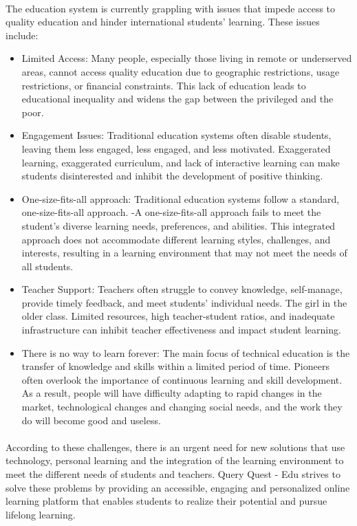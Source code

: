 \paragraph{} The education system is currently grappling with issues that impede access to quality education and hinder international students' learning. These issues include:
\begin{itemize}
\item Limited Access: Many people, especially those living in remote or underserved areas, cannot access quality education due to geographic restrictions, usage restrictions, or financial constraints. This lack of education leads to educational inequality and widens the gap between the privileged and the poor.

\item Engagement Issues: Traditional education systems often disable students, leaving them less engaged, less engaged, and less motivated. Exaggerated learning, exaggerated curriculum, and lack of interactive learning can make students disinterested and inhibit the development of positive thinking.

\item One-size-fits-all approach: Traditional education systems follow a standard, one-size-fits-all approach. -A one-size-fits-all approach fails to meet the student's diverse learning needs, preferences, and abilities. This integrated approach does not accommodate different learning styles, challenges, and interests, resulting in a learning environment that may not meet the needs of all students.

\item Teacher Support: Teachers often struggle to convey knowledge, self-manage, provide timely feedback, and meet students' individual needs. The girl in the older class. Limited resources, high teacher-student ratios, and inadequate infrastructure can inhibit teacher effectiveness and impact student learning.

\item There is no way to learn forever: The main focus of technical education is the transfer of knowledge and skills within a limited period of time. Pioneers often overlook the importance of continuous learning and skill development. As a result, people will have difficulty adapting to rapid changes in the market, technological changes and changing social needs, and the work they do will become good and useless.
\end{itemize} 

 \paragraph{}According to these challenges, there is an urgent need for new solutions that use technology, personal learning and the integration of the learning environment to meet the different needs of students and teachers. Query Quest - Edu strives to solve these problems by providing an accessible, engaging and personalized online learning platform that enables students to realize their potential and pursue lifelong learning.




